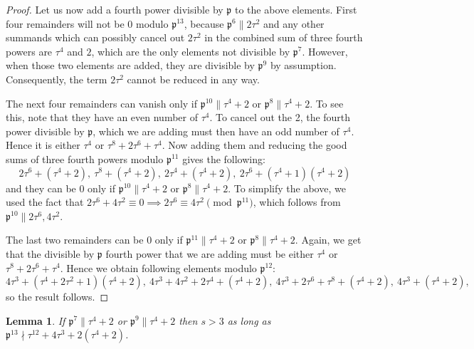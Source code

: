 \documentclass[12pt]{article}
\newtheorem{lemma}[thm]{Lemma}
\theoremstyle{remark}
\begin{document}
\begin{proof}
Let us now add a fourth power divisible by $\mathfrak{p}$ to the above elements. First four remainders will not be 0 modulo $\mathfrak{p}^{13}$, because $\mathfrak{p}^6 \parallel 2\tau^2$ and any other summands which can possibly cancel out $2\tau^2$ in the combined sum of three fourth powers are $\tau^4$ and $2$, which are the only elements not divisible by $\mathfrak{p}^7$. However, when those two elements are added, they are divisible by $\mathfrak{p}^9$ by assumption. Consequently, the term $2\tau^2$ cannot be reduced in any way.

The next four remainders can vanish only if $\mathfrak{p}^{10} \parallel \tau^4+2$ or $\mathfrak{p}^{8} \parallel \tau^4+2$. To see this, note that they have an even number of $\tau^4$. To cancel out the 2, the fourth power divisible by $\mathfrak{p}$, which we are adding must then have an odd number of $\tau^4$. Hence it is either $\tau^4$ or $\tau^8+2\tau^6+\tau^4$. Now adding them and reducing the good sums of three fourth powers modulo $\mathfrak{p}^{11}$ gives the following: 
\[ 2\tau^6 + (\tau^4 +2), \  \tau^8 + (\tau^4 + 2), \ 2\tau^4 + (\tau^4+2), \ 2\tau^6 + (\tau^4+1)(\tau^4+2)\]
and they can be 0 only if $\mathfrak{p}^{10} \parallel \tau^4+2$ or $\mathfrak{p}^{8} \parallel \tau^4+2$. To simplify the above, we used the fact that $2\tau^6 + 4\tau^2 \equiv 0 \implies 2\tau^6 \equiv 4\tau^2 \pmod{\mathfrak{p}^{11}} $, which follows from $\mathfrak{p}^{10} \parallel 2\tau^6, 4\tau^2 $. 

The last two remainders can be 0 only if $\mathfrak{p}^{11} \parallel \tau^4+2$ or $\mathfrak{p}^{8} \parallel \tau^4+2$. Again, we get that the divisible by $\mathfrak{p}$ fourth power that we are adding must be either $\tau^4$ or $\tau^8+2\tau^6+\tau^4$. Hence we obtain following elements modulo $\mathfrak{p}^{12}$:
\[ 4\tau^3 + (\tau^4+2\tau^2+1)(\tau^4+2), \ 4\tau^3 + 4\tau^2 + 2\tau^4 + (\tau^4+2), \ 4\tau^3 + 2\tau^6 + \tau^8 + (\tau^4+2), \  4\tau^3 + (\tau^4+2),\]
so the result follows. 
\end{proof}
\begin{lemma}\label{2.4} If $\mathfrak{p}^7 \parallel \tau^4+2$ or $\mathfrak{p}^9 \parallel \tau^4+2$ then $s > 3$ as long as $\mathfrak{p}^{13} \nmid \tau^{12}+4\tau^3+2(\tau^4+2)$.
\end{lemma}
\end{document}
